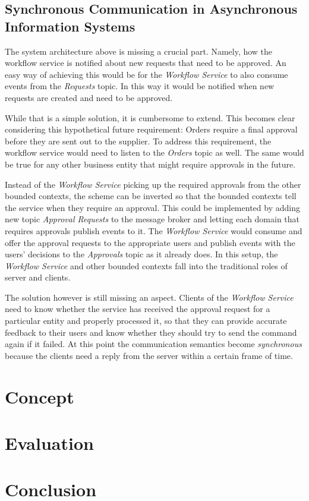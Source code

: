 \subsection{Synchronous Communication in Asynchronous Information Systems}

The system architecture above is missing a crucial part.
Namely, how the workflow service is notified about new requests that need to be approved.
An easy way of achieving this would be for the \emph{Workflow Service} to also consume events from the \emph{Requests} topic.
In this way it would be notified when new requests are created and need to be approved.

While that is a simple solution, it is cumbersome to extend.
This becomes clear considering this hypothetical future requirement: Orders require a final approval before they are sent out to the supplier.
To address this requirement, the workflow service would need to listen to the \emph{Orders} topic as well.
The same would be true for any other business entity that might require approvals in the future.

Instead of the \emph{Workflow Service} picking up the required approvals from the other bounded contexts, the scheme can be inverted so that the bounded contexts tell the service when they require an approval.
This could be implemented by adding new topic \emph{Approval Requests} to the message broker and letting each domain that requires approvals publish events to it.
The \emph{Workflow Service} would consume and offer the approval requests to the appropriate users and publish events with the users' decisions to the \emph{Approvals} topic as it already does.
In this setup, the \emph{Workflow Service} and other bounded contexts fall into the traditional roles of server and clients.

The solution however is still missing an aspect.
Clients of the \emph{Workflow Service} need to know whether the service has received the approval request for a particular entity and properly processed it, so that they can provide accurate feedback to their users and know whether they should try to send the command again if it failed.
At this point the communication semantics become \emph{synchronous} because the clients need a reply from the server within a certain frame of time.

\clearpage
\section{Concept}\label{sec:concept}

\clearpage
\section{Evaluation}\label{sec:evaluation}

\clearpage
\section{Conclusion}\label{sec:conclusion}
